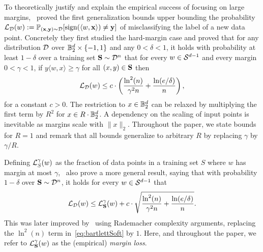 To theoretically justify and explain the empirical success of focusing on large margins,~\cite{Bartlett98generalizationperformance} proved the first generalization bounds upper bounding the probability $\mathcal{L}_{\mathcal{D}}(w) := \mathbb{P}_{(\mathbf{x},\mathbf{y}) \sim \mathcal{D}}[\operatorname{sign}(\langle w, \mathbf{x} \rangle) \neq \mathbf{y}]$ of misclassifying the label of a new data point. Concretely they first studied the hard-margin case and proved that for any distribution $\mathcal{D}$ over $\mathbb{B}_2^d \times \{-1,1\}$ and any $0 < \delta < 1$, it holds with probability at least $1-\delta$ over a training set $\mathbf{S} \sim \mathcal{D}^n$ that for every $w \in \mathcal{S}^{d-1}$ and every margin $0 < \gamma < 1$, if $y\langle w,x\rangle \geq \gamma$ for all $(x,y) \in \mathbf{S}$ then
\begin{align}
    \mathcal{L}_{\mathcal{D}}(w)  \leq c \cdot \left(\frac{\ln^2(n)}{\gamma^2 n} + \frac{\ln(e/\delta)}{n}\right),\label{eq:bartlett}
\end{align}
for a constant $c>0$. The restriction to $x \in \mathbb{B}_2^d$ can be relaxed by multiplying the first term by $R^2$ for $x \in R\cdot \mathbb{B}_2^d$. A dependency on the scaling of input points is inevitable as margins scale with $\|x\|_2$. Throughout the paper, we state bounds for $R=1$ and remark that all bounds generalize to arbitrary $R$ by replacing $\gamma$ by $\gamma/R$.

Defining $\mathcal{L}^\gamma_S(w)$ as the fraction of data points in a training set $S$ where $w$ has margin at most $\gamma$,~\cite{Bartlett98generalizationperformance} also prove a more general result, saying that with probability $1-\delta$ over $\mathbf{S} \sim \mathcal{D}^n$, it holds for every $w \in \mathcal{S}^{d-1}$ that
\begin{align}
    \mathcal{L}_{\mathcal{D}}(w) \leq \mathcal{L}_{\mathbf{S}}^\gamma(w) + c \cdot \sqrt{\frac{\ln^2(n)}{\gamma^2 n} + \frac{\ln(e/\delta)}{n}}.\label{eq:bartlettSoft}
\end{align}
This was later improved by~\cite{DBLP:journals/jmlr/BartlettM02} using Rademacher complexity arguments, replacing the $\ln^2(n)$ term in~\eqref{eq:bartlettSoft} by $1$. Here, and throughout the paper, we refer to $\mathcal{L}^\gamma_{\mathbf{S}}(w)$ as the (empirical) \emph{margin loss}.

